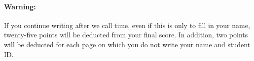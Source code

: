 \documentclass[addpoints,12pt]{exam}
\begin{document}
\paragraph{Warning:} If you continue writing after we call time, even if this is only to fill in your name, twenty-five points will be deducted from your final score. In addition, two points will be deducted for each page on which you do not write your name and student ID. 

\newpage
\begin{questions}





\end{questions}
\end{document}

